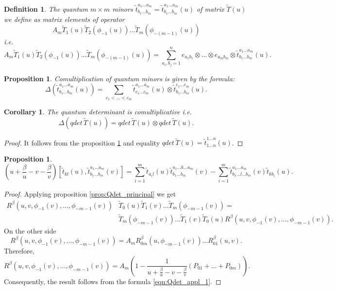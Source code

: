\documentclass[10pt]{article}%
\numberwithin{equation}{section}
\newtheorem{cor}[thm]{Corollary}
\newtheorem{prop}[thm]{Proposition}
\newtheorem{defin}[thm]{Definition}
\begin{document}
\begin{defin}
    The quantum $m\times m$ minors $\tilde{t}_{b_1\ldots b_m}^{a_1\ldots a_m}=\tilde{t}_{b_1\ldots b_m}^{a_1\ldots a_m}(u)$ of matrix $\tilde{T}(u)$ we define as matrix elements of operator 
    \[
    A_m\tilde{T}_1(u)\tilde{T}_2(\phi_{-1}(u))\ldots  \tilde{T}_{m}(\phi_{-(m-1)}(u))
    \] i.e.
\[
A_m\tilde{T}_1(u)\tilde{T}_2(\phi_{-1}(u))\ldots  \tilde{T}_{m}(\phi_{-(m-1)}(u))=\sum\limits_{a_i,b_j=1}^{n}e_{a_1b_1}\otimes \ldots \otimes e_{a_m b_m}\otimes \tilde{t}_{b_1\ldots b_m}^{a_1\ldots a_m}(u).
\]    
\end{defin}
\begin{prop}\label{prop:comult_min}
Comultiplication of quantum minors is given by the formula:
\begin{equation}
\Delta(\tilde{t}_{b_1\ldots b_m}^{a_1\ldots a_m}(u))=\sum\limits_{c_1<\ldots< c_m} \tilde{t}_{c_1\ldots c_m}^{a_1\ldots a_m}(u)\otimes \tilde{t}_{b_1\ldots b_m}^{c_1\ldots c_m}(u).
\end{equation}
\end{prop}
\begin{cor}
    The quantum determinant is comultiplicative i.e.
    \[
    \Delta(qdet\,\tilde{T}(u))=qdet\,\tilde{T}(u)\otimes qdet\,\tilde{T}(u).
    \]
\end{cor}
\begin{proof}
    It follows from the proposition \ref{prop:comult_min} and equality $qdet\,\tilde{T}(u)=\tilde{t}_{1\ldots n}^{1\ldots n}(u)$.
\end{proof}
\begin{prop}\label{prop:Qdet_2}
    \begin{equation}
        (u+\frac{\beta}{u}-v-\frac{\beta}{v})[\tilde{t}_{kl}(u),\tilde{t}_{b_1\ldots b_m}^{a_1\ldots a_m}(v)]=\sum\limits_{i=1}^m \tilde{t}_{a_i l}(u)\tilde{t}_{b_1\ldots b_m}^{a_1\ldots k\ldots a_m}(v)-\sum\limits_{i=1}^m \tilde{t}_{b_1\ldots l\ldots b_m}^{a_1\ldots a_m}(v) \tilde{t}_{k b_i}(u).
    \end{equation}
\end{prop}
\begin{proof}
Applying proposition \ref{prop:Qdet_principal} we get
\begin{align}
R^{\beta}(u,v,\phi_{-1}(v),\ldots,\phi_{-{m-1}}(v)) &\tilde{T}_0(u) \tilde{T}_1(v)\ldots \tilde{T}_m(\phi_{-{m-1}}(v))=\nonumber\\
&\tilde{T}_m(\phi_{-{m-1}}(v))\ldots \tilde{T}_1(v)\tilde{T}_0(u)R^{\beta}(u,v,\phi_{-1}(v),\ldots,\phi_{-{m-1}}(v))\label{eqn:Qdet_appl_1}.
\end{align}
On the other side
\[
R^{\beta}(u,v,\phi_{-1}(v),\ldots,\phi_{-{m-1}}(v))=A_m R^{\beta}_{0 m}(u,\phi_{-{m-1}}(v))\ldots R^{\beta}_{0 1}(u,v).
\]
Therefore,
\[
R^{\beta}(u,v,\phi_{-1}(v),\ldots,\phi_{-{m-1}}(v))=A_m \left(1-\frac{1}{u+\frac{\beta}{u}-v-\frac{\beta}{v}}(P_{0 1}+\ldots +P_{0 m})\right).
\]
Consequently, the result follows from the formula \eqref{eqn:Qdet_appl_1}.
\end{proof}
\end{document}
